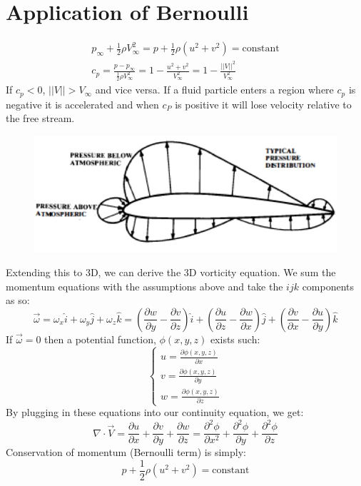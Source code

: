 \documentclass[class=report, crop=false, 12pt,a4paper]{standalone}
\begin{document}
\section{Application of Bernoulli}
\begin{gather}
  p_\infty + \frac{1}{2} \rho V_\infty^2 = p + \frac{1}{2} \rho (u^2 + v^2) = \textrm{constant}\\
  c_p = \frac{p - p_{\infty}}{\frac{1}{2} \rho V_{\infty}^2} = 1 - \frac{u^2 + v^2}{V_\infty^2} = 1 - \frac{||V||^2}{V_\infty^2}
\end{gather}
If $c_p < 0$, $||V|| > V_\infty$ and vice versa. If a fluid particle enters a region where $c_p$ is negative it is accelerated and when $c_P$ is positive it will lose velocity relative to the free stream.
\begin{figure}[H]
  \centering
  \includegraphics[width = 0.8 \textwidth]{../img/diagram12.png}
\end{figure}
Extending this to 3D, we can derive the 3D vorticity equation. We sum the momentum equations with the assumptions above and take the $ijk$ components as so:
\begin{equation}
  \vec{\omega} = \omega_x \hat{i} + \omega_y \hat{j} + \omega_z \hat{k} = \left( \frac{\partial w}{\partial y} - \frac{\partial v}{\partial z}\right) \hat{i} + \left( \frac{\partial u}{\partial z} - \frac{\partial w}{\partial x}\right) \hat{j} + \left(\frac{\partial v}{\partial x} - \frac{\partial u}{\partial y} \right) \hat{k}
\end{equation}
If $\vec{\omega} = 0$ then a potential function, $\phi(x, y, z)$ exists such:
\begin{equation}
  \begin{cases}
    u = \frac{\partial \phi (x,y,z)}{\partial x}\\
    v = \frac{\partial \phi (x,y,z)}{\partial y}\\
    w = \frac{\partial \phi (x,y,z)}{\partial z}
  \end{cases}
\end{equation}
By plugging in these equations into our continuity equation, we get:
\begin{equation}
  \nabla \cdot \vec{V} = \frac{\partial u}{\partial x} + \frac{\partial v}{\partial y} + \frac{\partial w}{\partial z} = \frac{\partial^2 \phi}{\partial x^2} + \frac{\partial^2 \phi}{\partial y} + \frac{\partial^2 \phi}{\partial z}
\end{equation}
Conservation of momentum (Bernoulli term) is simply:
\begin{equation}
  p + \frac{1}{2} \rho (u^2 + v^2) = \textrm{constant}
\end{equation}
\end{document}
